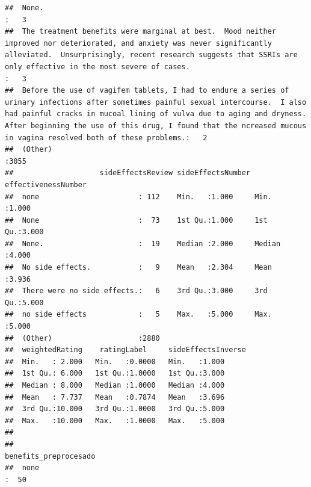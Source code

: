 \documentclass[spanish,]{article}
\begin{document}
\begin{verbatim}
##  None.                                                                                                                                                                                                                                                                                                                          :   3  
##  The treatment benefits were marginal at best.  Mood neither improved nor deteriorated, and anxiety was never significantly alleviated.  Unsurprisingly, recent research suggests that SSRIs are only effective in the most severe of cases.                                                                                    :   3  
##  Before the use of vagifem tablets, I had to endure a series of urinary infections after sometimes painful sexual intercourse.  I also had painful cracks in mucoal lining of vulva due to aging and dryness.  After beginning the use of this drug, I found that the ncreased mucous in vagina resolved both of these problems.:   2  
##  (Other)                                                                                                                                                                                                                                                                                                                        :3055  
##                    sideEffectsReview sideEffectsNumber effectivenessNumber
##  none                       : 112    Min.   :1.000     Min.   :1.000      
##  None                       :  73    1st Qu.:1.000     1st Qu.:3.000      
##  None.                      :  19    Median :2.000     Median :4.000      
##  No side effects.           :   9    Mean   :2.304     Mean   :3.936      
##  There were no side effects.:   6    3rd Qu.:3.000     3rd Qu.:5.000      
##  no side effects            :   5    Max.   :5.000     Max.   :5.000      
##  (Other)                    :2880                                         
##  weightedRating    ratingLabel     sideEffectsInverse
##  Min.   : 2.000   Min.   :0.0000   Min.   :1.000     
##  1st Qu.: 6.000   1st Qu.:1.0000   1st Qu.:3.000     
##  Median : 8.000   Median :1.0000   Median :4.000     
##  Mean   : 7.737   Mean   :0.7874   Mean   :3.696     
##  3rd Qu.:10.000   3rd Qu.:1.0000   3rd Qu.:5.000     
##  Max.   :10.000   Max.   :1.0000   Max.   :5.000     
##                                                      
##                                                                                                                                           benefits_preprocesado
##  none                                                                                                                                                :  50     

\end{verbatim}
\end{document}
